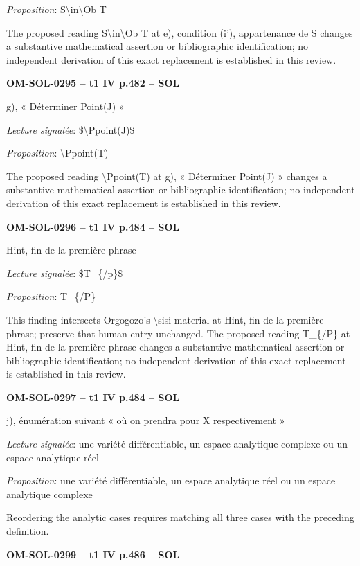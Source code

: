 \emph{Proposition}: S\textbackslash{}in\textbackslash{}Ob T\par
The proposed reading S\textbackslash{}in\textbackslash{}Ob T at e), condition (i'), appartenance de S changes a substantive mathematical assertion or bibliographic identification; no independent derivation of this exact replacement is established in this review.\par
\par\noindent\textbf{OM-SOL-0295 -- t1 IV p.482 -- SOL}\par
g), « Déterminer Point(J) »\par
\emph{Lecture signalée}: \$\textbackslash{}Ppoint(J)\$\par
\emph{Proposition}: \textbackslash{}Ppoint(T)\par
The proposed reading \textbackslash{}Ppoint(T) at g), « Déterminer Point(J) » changes a substantive mathematical assertion or bibliographic identification; no independent derivation of this exact replacement is established in this review.\par
\par\noindent\textbf{OM-SOL-0296 -- t1 IV p.484 -- SOL}\par
Hint, fin de la première phrase\par
\emph{Lecture signalée}: \$T\_\{/p\}\$\par
\emph{Proposition}: T\_\{/P\}\par
This finding intersects Orgogozo's \textbackslash{}sisi material at Hint, fin de la première phrase; preserve that human entry unchanged. The proposed reading T\_\{/P\} at Hint, fin de la première phrase changes a substantive mathematical assertion or bibliographic identification; no independent derivation of this exact replacement is established in this review.\par
\par\noindent\textbf{OM-SOL-0297 -- t1 IV p.484 -- SOL}\par
j), énumération suivant « où on prendra pour X respectivement »\par
\emph{Lecture signalée}: une variété différentiable, un espace analytique complexe ou un espace analytique réel\par
\emph{Proposition}: une variété différentiable, un espace analytique réel ou un espace analytique complexe\par
Reordering the analytic cases requires matching all three cases with the preceding definition.\par
\par\noindent\textbf{OM-SOL-0299 -- t1 IV p.486 -- SOL}\par
